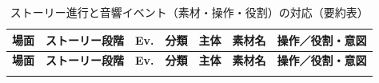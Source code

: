 \begin{longtable}{p{0.6cm} p{2.8cm} p{1.6cm} p{1.5cm} p{1.5cm} p{3.0cm} p{4.1cm}}
	\caption{ストーリー進行と音響イベント（素材・操作・役割）の対応（要約表）}                                                                                                                                            \\
	\hline
	\textbf{場面} & \textbf{ストーリー段階}     & \textbf{Ev.}            & \textbf{分類} & \textbf{主体}   & \textbf{素材名}                              & \textbf{操作／役割・意図}                            \\
	\hline
	\endfirsthead
	\hline
	\textbf{場面} & \textbf{ストーリー段階}     & \textbf{Ev.}            & \textbf{分類} & \textbf{主体}   & \textbf{素材名}                              & \textbf{操作／役割・意図}                            \\
	\hline
	\endhead
	\hline
	\endfoot


\end{longtable}
